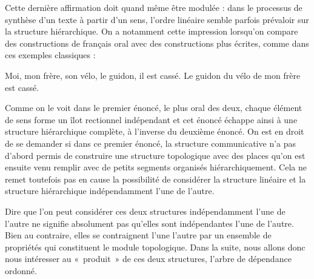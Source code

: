 {    Cette dernière affirmation doit quand même être modulée : dans le processus de synthèse d’un texte à partir d’un sens, l’ordre linéaire semble parfois prévaloir sur la structure hiérarchique. On a notamment cette impression lorsqu’on compare des constructions de français oral avec des constructions plus écrites, comme dans ces exemples classiques :

    \ea
    \ea  Moi, mon frère, son vélo, le guidon, il est cassé.
    \ex  Le guidon du vélo de mon frère est cassé.
    \z
    \z

    Comme on le voit dans le premier énoncé, le plus oral des deux, chaque élément de sens forme un îlot rectionnel indépendant et cet énoncé échappe ainsi à une structure hiérarchique complète, à l’inverse du deuxième énoncé. On est en droit de se demander si dans ce premier énoncé, la structure communicative n’a pas d’abord permis de construire une structure topologique avec des places qu’on est ensuite venu remplir avec de petits segments organisés hiérarchiquement. Cela ne remet toutefois pas en cause la possibilité de considérer la structure linéaire et la structure hiérarchique indépendamment l’une de l’autre.

    Dire que l’on peut considérer ces deux structures indépendamment l’une de l’autre ne signifie absolument pas qu’elles sont indépendantes l’une de l’autre. Bien au contraire, elles se contraignent l’une l’autre par un ensemble de propriétés qui constituent le module topologique. Dans la suite, nous allons donc nous intéresser au «~produit~» de ces deux structures, l’arbre de dépendance ordonné.
}
